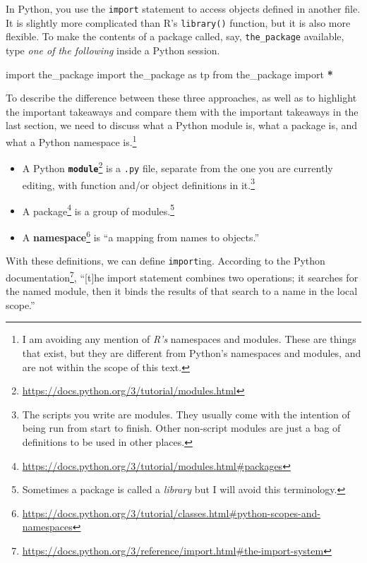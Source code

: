 \documentclass[12pt,krantz2]{krantz}
\makeatletter
\newenvironment{Shaded}{\begin{snugshade}}{\end{snugshade}}
\newcommand{\ImportTok}[1]{#1}
\newcommand{\NormalTok}[1]{#1}
\newcommand{\OperatorTok}[1]{\textcolor[rgb]{0.43,0.43,0.43}{\textbf{#1}}}
\renewcommand{\href}[2]{#2\footnote{\url{#1}}}
\newenvironment{kframe}{%
\medskip{}
\setlength{\fboxsep}{.8em}
 \def\at@end@of@kframe{}%
 \ifinner\ifhmode%
  \def\at@end@of@kframe{\end{minipage}}%
  \begin{minipage}{\columnwidth}%
 \fi\fi%
 \def\FrameCommand##1{\hskip\@totalleftmargin \hskip-\fboxsep
 \colorbox{shadecolor}{##1}\hskip-\fboxsep
     \hskip-\linewidth \hskip-\@totalleftmargin \hskip\columnwidth}%
 \MakeFramed {\advance\hsize-\width
   \@totalleftmargin\z@ \linewidth\hsize
   \@setminipage}}%
 {\par\unskip\endMakeFramed%
 \at@end@of@kframe}
\renewenvironment{Shaded}{\begin{kframe}}{\end{kframe}}
\makeatother
\begin{document}
In Python, you use the \texttt{import} statement to access objects defined in another file. It is slightly more complicated than R's \texttt{library()} function, but it is also more flexible. To make the contents of a package called, say, \texttt{the\_package} available, type \emph{one of the following} inside a Python session.

\begin{Shaded}
\begin{Highlighting}[]
\ImportTok{import}\NormalTok{ the_package}
\ImportTok{import}\NormalTok{ the_package }\ImportTok{as}\NormalTok{ tp }
\ImportTok{from}\NormalTok{ the_package }\ImportTok{import} \OperatorTok{*}
\end{Highlighting}
\end{Shaded}

To describe the difference between these three approaches, as well as to highlight the important takeaways and compare them with the important takeaways in the last section, we need to discuss what a Python module is, what a package is, and what a Python namespace is.\footnote{I am avoiding any mention of \emph{R's} namespaces and modules. These are things that exist, but they are different from Python's namespaces and modules, and are not within the scope of this text.}

\begin{itemize}
\item
  A Python \href{https://docs.python.org/3/tutorial/modules.html}{\textbf{\texttt{module}}} is a \texttt{.py} file, separate from the one you are currently editing, with function and/or object definitions in it.\footnote{The scripts you write are modules. They usually come with the intention of being run from start to finish. Other non-script modules are just a bag of definitions to be used in other places.}
\item
  A \href{https://docs.python.org/3/tutorial/modules.html\#packages}{package} is a group of modules.\footnote{Sometimes a package is called a \emph{library} but I will avoid this terminology.}
\item
  A \href{https://docs.python.org/3/tutorial/classes.html\#python-scopes-and-namespaces}{\textbf{namespace}} is ``a mapping from names to objects.''
\end{itemize}

With these definitions, we can define \texttt{import}ing. According to the \href{https://docs.python.org/3/reference/import.html\#the-import-system}{Python documentation}, ``{[}t{]}he import statement combines two operations; it searches for the named module, then it binds the results of that search to a name in the local scope.''
\end{document}
